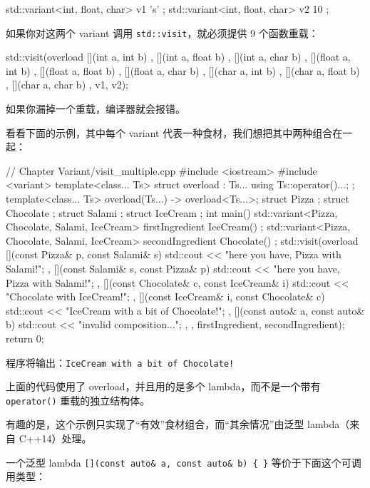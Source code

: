 \begin{codebox}[cpp]
std::variant<int, float, char> v1 { 's' };
std::variant<int, float, char> v2 { 10 };
\end{codebox}

如果你对这两个 variant 调用 \texttt{std::visit}，就必须提供 9 个函数重载：

\begin{codebox}[cpp]
std::visit(overload{
[](int a, int b) { },
[](int a, float b) { },
[](int a, char b) { },
[](float a, int b) { },
[](float a, float b) { },
[](float a, char b) { },
[](char a, int b) { },
[](char a, float b) { },
[](char a, char b) { }
}, v1, v2);
\end{codebox}

如果你漏掉一个重载，编译器就会报错。

看看下面的示例，其中每个 variant 代表一种食材，我们想把其中两种组合在一起：

\begin{codebox}[cpp]
// Chapter Variant/visit_multiple.cpp
#include <iostream>
#include <variant>
template<class... Ts> struct overload : Ts... { using Ts::operator()...; };
template<class... Ts> overload(Ts...) -> overload<Ts...>;
struct Pizza { };
struct Chocolate { };
struct Salami { };
struct IceCream { };
int main() {
std::variant<Pizza, Chocolate, Salami, IceCream> firstIngredient { IceCream() };
std::variant<Pizza, Chocolate, Salami, IceCream> secondIngredient { Chocolate() };
std::visit(overload{
[](const Pizza& p, const Salami& s) {
std::cout << "here you have, Pizza with Salami!\n";
},
[](const Salami& s, const Pizza& p) {
std::cout << "here you have, Pizza with Salami!\n";
},
[](const Chocolate& c, const IceCream& i) {
std::cout << "Chocolate with IceCream!\n";
},
[](const IceCream& i, const Chocolate& c) {
std::cout << "IceCream with a bit of Chocolate!\n";
},
[](const auto& a, const auto& b) {
std::cout << "invalid composition...\n";
},
}, firstIngredient, secondIngredient);
return 0;
}
\end{codebox}

程序将输出：\texttt{IceCream with a bit of Chocolate!}

上面的代码使用了 overload，并且用的是多个 lambda，而不是一个带有 \texttt{operator()} 重载的独立结构体。

有趣的是，这个示例只实现了“有效”食材组合，而“其余情况”由泛型 lambda（来自 C++14）处理。

一个泛型 lambda \texttt{[](const auto\& a, const auto\& b) \{ \}} 等价于下面这个可调用类型：

